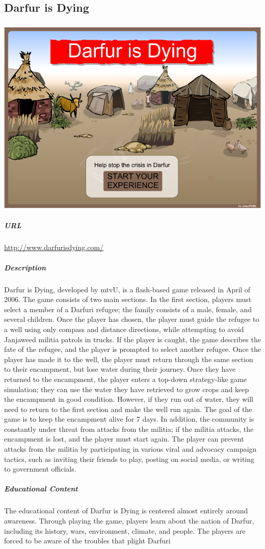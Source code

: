 \subsection{Darfur is Dying}\subparagraph{}\includegraphics[width = \textwidth]{img/darfur_title.png}\subparagraph{URL}\url{http://www.darfurisdying.com/}\subparagraph{Description}Darfur is Dying, developed by mtvU, is a flash-based game released in April of 2006. The game consists of two main sections. In the first section, players must select a member of a Darfuri refugee; the family consists of a male, female, and several children. Once the player has chosen, the player must guide the refugee to a well using only compass and distance directions, while attempting to avoid Janjaweed militia patrols in trucks. If the player is caught, the game describes the fate of the refugee, and the player is prompted to select another refugee. Once the player has made it to the well, the player must return through the same section to their encampment, but lose water during their journey. Once they have returned to the encampment, the player enters a top-down strategy-like game simulation; they can use the water they have retrieved to grow crops and keep the encampment in good condition. However, if they run out of water, they will need to return to the first section and make the well run again. The goal of the game is to keep the encampment alive for 7 days. In addition, the community is constantly under threat from attacks from the militia; if the militia attacks, the encampment is lost, and the player must start again. The player can prevent attacks from the militia by participating in various viral and advocacy campaign tactics, such as inviting their friends to play, posting on social media, or writing to government officials. \subparagraph{Educational Content}The educational content of Darfur is Dying is centered almost entirely around awareness. Through playing the game, players learn about the nation of Darfur, including its history, wars, environment, climate, and people. The players are forced to be aware of the troubles that plight Darfuri 